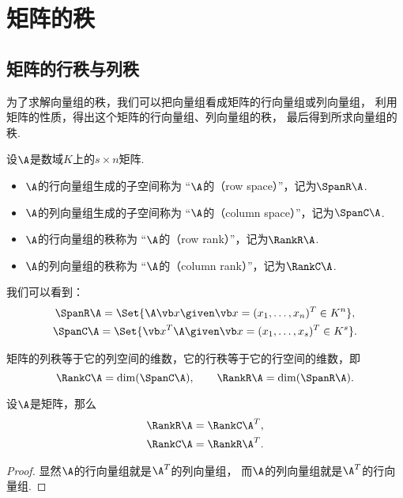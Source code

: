 \section{矩阵的秩}
\subsection{矩阵的行秩与列秩}
为了求解向量组的秩，我们可以把向量组看成矩阵的行向量组或列向量组，
利用矩阵的性质，得出这个矩阵的行向量组、列向量组的秩，
最后得到所求向量组的秩.

\begin{definition}\label{definition:线性方程组.行秩与列秩的定义}
设\(\A\)是数域\(K\)上的\(s \times n\)矩阵.
\begin{itemize}
	\item \(\A\)的行向量组生成的子空间称为
	“\(\A\)的（row space）”，记为\(\SpanR\A\).
	\item \(\A\)的列向量组生成的子空间称为
	“\(\A\)的（column space）”，记为\(\SpanC\A\).
	\item \(\A\)的行向量组的秩称为
	“\(\A\)的（row rank）”，记为\(\RankR\A\).
	\item \(\A\)的列向量组的秩称为
	“\(\A\)的（column rank）”，记为\(\RankC\A\).
\end{itemize}
\end{definition}

我们可以看到：\begin{gather*}
	\SpanR\A = \Set{
		\A\x \given \x=(x_1,\dotsc,x_n)^T \in K^n
	}, \\
	\SpanC\A = \Set{
		\x^T\A \given \x=(x_1,\dotsc,x_s)^T \in K^s
	}.
\end{gather*}

矩阵的列秩等于它的列空间的维数，它的行秩等于它的行空间的维数，即\[
	\RankC\A=\dim(\SpanC\A), \qquad
	\RankR\A=\dim(\SpanR\A).
\]

\begin{proposition}\label{theorem:向量空间.矩阵的行秩与列秩分别等于它的转置矩阵的列秩与行秩}
设\(\A\)是矩阵，那么\begin{gather}
	\RankR\A=\RankC\A^T, \\
	\RankC\A=\RankR\A^T.
\end{gather}
\begin{proof}
显然\(\A\)的行向量组就是\(\A^T\)的列向量组，
而\(\A\)的列向量组就是\(\A^T\)的行向量组.
\end{proof}
\end{proposition}


